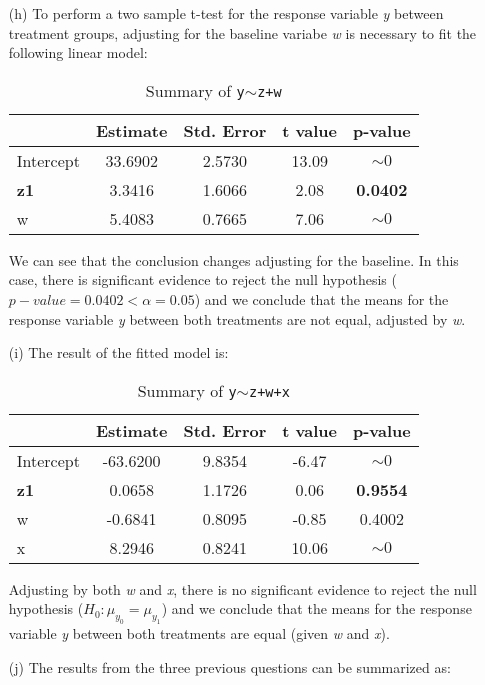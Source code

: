 \documentclass[11pt,a4paper]{article}
\begin{document}
\begin{enumerate}
\item[(h)] To perform a two sample t-test for the response variable \emph{y} between treatment groups, adjusting for the baseline variabe 
\emph{w} is necessary to fit the following linear model:

\begin{table}[h!]
\centering
\begin{tabular}{lcccc}
  \hline
 & Estimate & Std. Error & t value & p-value \\ 
  \hline
Intercept & 33.6902 & 2.5730 & 13.09 & $\sim 0$ \\ 
  \textbf{z1} & 3.3416 & 1.6066 & 2.08 & \textbf{0.0402} \\ 
  w & 5.4083 & 0.7665 & 7.06 & $\sim 0$ \\ 
   \hline
\end{tabular}
\caption{Summary of \texttt{y$\sim$z+w} }
\end{table}

We can see that the conclusion changes adjusting for the baseline. In this case, there is significant evidence to 
reject the null hypothesis ($p-value=0.0402<\alpha=0.05$) and we conclude that the 
means for the response variable \emph{y} between both treatments are not equal, adjusted by \emph{w}.


\item[(i)] The result of the fitted model is:

\begin{table}[h!]
\centering
\begin{tabular}{lcccc}
  \hline
 & Estimate & Std. Error & t value & p-value \\ 
  \hline
Intercept & -63.6200 & 9.8354 & -6.47 & $\sim 0$ \\ 
 \textbf{z1} & 0.0658 & 1.1726 & 0.06 & \textbf{0.9554} \\ 
  w & -0.6841 & 0.8095 & -0.85 & 0.4002 \\ 
  x & 8.2946 & 0.8241 & 10.06 & $\sim 0$ \\ 
   \hline
\end{tabular}
\caption{Summary of \texttt{y$\sim$z+w+x} }
\end{table}

Adjusting by both \emph{w} and \emph{x}, there is no significant evidence to reject the null hypothesis ($H_0:\mu_{y_0} =\mu_{y_1}$)
 and we conclude that the means for the response variable \emph{y} between both treatments are equal (given \emph{w} and \emph{x}). 

\newpage
\item[(j)] The results from the three previous questions can be summarized as:


\end{enumerate}
\end{document}
